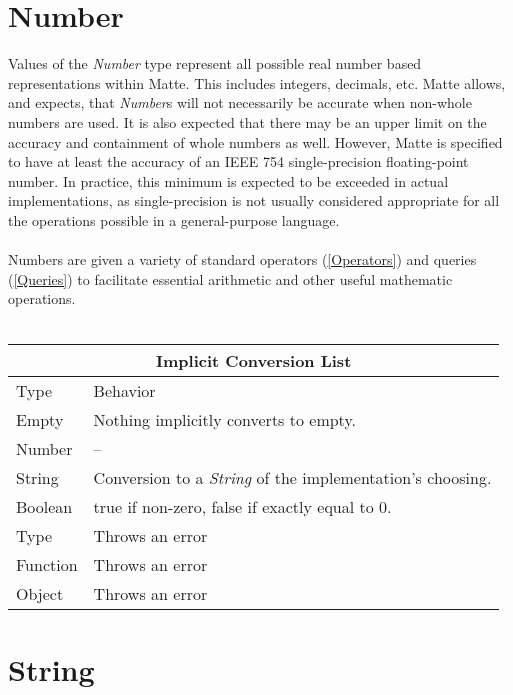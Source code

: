 \documentclass[12pt,letterpaper]{report}
\begin{document}
\section{Number}\label{Number}

Values of the \textit{Number} type represent all possible real number based representations within 
Matte. This includes integers, decimals, etc. Matte allows, and expects, that \textit{Number}s will not 
necessarily be accurate when non-whole numbers are used. It is also expected that there may 
be an upper limit on the accuracy and containment of whole numbers as well. However, Matte is 
specified to have at least the accuracy of an IEEE 754 single-precision floating-point number.
In practice, this minimum is expected to be exceeded in actual implementations, as single-precision 
is not usually considered appropriate for all the operations possible in a general-purpose language.
\\\\
Numbers are given a variety of standard operators (\autoref{Operators}) and queries (\autoref{Queries}) to facilitate 
essential arithmetic and other useful mathematic operations.
\\\\
{
\centering
\begin{tabular}{ |p{2.5cm}||p{10cm}|  }
  \hline
  \multicolumn{2}{|c|}{Implicit Conversion List} \\
  \hline
  Type & Behavior\\
  \hline
  Empty & Nothing implicitly converts to empty.\\
  Number  & -- \\
  String & Conversion to a \textit{String} of the implementation's choosing.\\
  Boolean & true if non-zero, false if exactly equal to 0.\\
  Type & Throws an error\\
  Function & Throws an error\\
  Object & Throws an error\\
 \hline
\end{tabular}
}




\section{String}\label{String}
\end{document}
